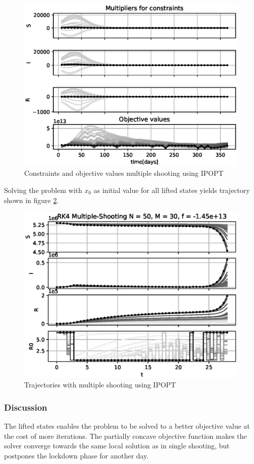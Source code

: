 \begin{figure}[H]
    \centering
    \includegraphics[width=.8\textwidth]{pythonProject/Figures/Multiple_Shooting_obj_con_IPOPT_traj_initial_Social_Distancing.eps}
    \caption{Constraints and objective values multiple shooting using IPOPT}
    \label{fig:MS_Cons_Obj_IPOPT}
\end{figure}

Solving the problem with $x_0$ as initial value for all lifted states yields trajectory shown in figure \ref{fig:MS_Traj_IPOPT}.

\begin{figure}[H]
    \centering
    \includegraphics[width=.8\textwidth]{pythonProject/Figures/Multiple_Shooting_Trajectory_IPOPT.eps}
    \caption{Trajectories with multiple shooting using IPOPT}
    \label{fig:MS_Traj_IPOPT}
\end{figure}

\subsubsection{Discussion}
The lifted states enables the problem to be solved to a better objective value at the cost of more iterations. The partially concave objective function makes the solver converge towards the same local solution as in single shooting, but postpones the lockdown phase for another day.

